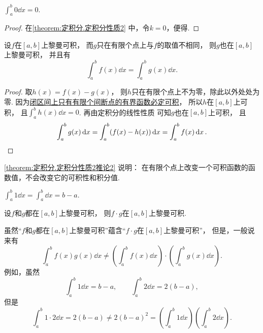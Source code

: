 \begin{corollary}\label{theorem:定积分.定积分性质2推论1}
\(\int_a^b 0 \dd{x} = 0\).
\begin{proof}
在\cref{theorem:定积分.定积分性质2} 中，令\(k=0\)，便得.
\end{proof}
\end{corollary}

\begin{corollary}\label{theorem:定积分.定积分性质2推论2}
设\(f\)在\([a,b]\)上黎曼可积，
而\(g\)只在有限个点上与\(f\)的取值不相同，
则\(g\)也在\([a,b]\)上黎曼可积，
并且有\[
	\int_a^b f(x) \dd{x}
	= \int_a^b g(x) \dd{x}.
\]
\begin{proof}
取\(h(x) = f(x) - g(x)\)，
则\(h\)只在有限个点上不为零，除此以外处处为零.
因为\hyperref[theorem:定积分.黎曼可积条件.闭区间上只有有限个间断点的有界函数必定可积]{闭区间上只有有限个间断点的有界函数必定可积}，
所以\(h\)在\([a,b]\)上可积，
且\(\int_a^b h(x) \dd{x} = 0\).
再由定积分的线性性质 
可知\(g\)也在\([a,b]\)上可积，
且\[
	\int_a^b g(x) \dd{x}
	= \int_a^b (f(x) - h(x)) \dd{x}
	= \int_a^b f(x) \dd{x}.
	\qedhere
\]
\end{proof}
\end{corollary}
\begin{remark}
\cref{theorem:定积分.定积分性质2推论2} 说明：
在有限个点上改变一个可积函数的函数值，不会改变它的可积性和积分值.
\end{remark}

\begin{property}\label{theorem:定积分.定积分性质4}
\(\int_a^b 1 \dd{x}
= \int_a^b \dd{x}
= b-a\).
\end{property}

\begin{property}\label{theorem:定积分.乘积可积性}
设\(f\)和\(g\)都在\([a,b]\)上黎曼可积，
则\(f \cdot g\)在\([a,b]\)上黎曼可积.
\end{property}
\begin{remark}
虽然“\(f\)和\(g\)都在\([a,b]\)上黎曼可积”蕴含“\(f \cdot g\)在\([a,b]\)上黎曼可积”，
但是，一般说来有\[
	\int_a^b f(x) g(x) \dd{x}
	\neq
	\left(
		\int_a^b f(x) \dd{x}
	\right) \cdot \left(
		\int_a^b g(x) \dd{x}
	\right).
\]
例如，虽然\[
	\int_a^b 1 \dd{x} = b-a, \qquad
	\int_a^b 2 \dd{x} = 2(b-a),
\]
但是\[
	\int_a^b 1\cdot2 \dd{x} = 2(b-a)
	\neq
	2(b-a)^2 = \left(\int_a^b 1 \dd{x}\right) \left(\int_a^b 2 \dd{x}\right).
\]
\end{remark}

